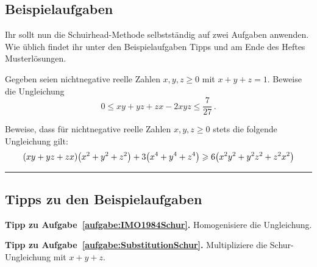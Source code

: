 \subsection*{Beispielaufgaben}
Ihr sollt nun die Schuirhead-Methode selbstständig auf zwei Aufgaben anwenden. Wie üblich findet ihr unter den Beispielaufgaben Tipps und am Ende des Heftes Musterlösungen.
\begin{aufgabe*}\label{aufgabe:IMO1984Schur}
	Gegeben seien nichtnegative reelle Zahlen $x,y,z\geqslant 0$ mit $x+y+z=1$. Beweise die Ungleichung
	\begin{equation*}
		0\leqslant xy+yz+zx-2xyz\leqslant\frac{7}{27}\,.
	\end{equation*}
\end{aufgabe*}
\begin{aufgabe*}\label{aufgabe:SubstitutionSchur}
	Beweise, dass für nichtnegative reelle Zahlen $x,y,z\geqslant 0$ stets die folgende Ungleichung gilt:
	\begin{equation*}
		(xy+yz+zx)\parens*{x^2+y^2+z^2}+3\parens*{x^4+y^4+z^4}\geqslant 6\parens*{x^2y^2+y^2z^2+z^2x^2}
	\end{equation*}
\end{aufgabe*}

\phantom{newpage}\vfill\hrule\vspace{-1em}

\subsection*{Tipps zu den Beispielaufgaben}
\textbf{Tipp zu Aufgabe~\ref{aufgabe:IMO1984Schur}.} Homogenisiere die Ungleichung.

\textbf{Tipp zu Aufgabe~\ref{aufgabe:SubstitutionSchur}.} Multipliziere die Schur-Ungleichung mit $x+y+z$.